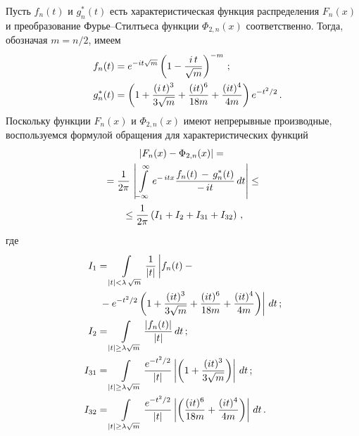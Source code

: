 \begin{multicols}{2}
Пусть $f_n(t)$ и $g^*_n(t)$ есть характеристическая функция распределения   $F_n(x)$ и преобразование Фурье--Стил\-тье\-са 
функции   $\Phi_{2,n}(x)$ соответственно. Тогда, обозначая   $m=n/2$, имеем
\begin{align*}
 f_n(t) &= e^{-it\sqrt{m}}\left(1-\displaystyle\frac{\displaystyle i\,t\mathstrut}{\displaystyle \sqrt{m}\mathstrut}\right)^{-m}\,;
\\
\quad g^*_n(t) &=
\left(1+\displaystyle\frac{\displaystyle (i\,t)^3\mathstrut}{\displaystyle 3\sqrt{m}\mathstrut}+\displaystyle\frac{\displaystyle (it)^6\mathstrut}{\displaystyle 18m\mathstrut}+\displaystyle\frac{\displaystyle (it)^4\mathstrut}{\displaystyle 4m\mathstrut} \right) e^{-t^2/2}\,. 
\end{align*}
Поскольку функции $F_n(x)$ и $\Phi_{2,n}(x)$ имеют непрерывные производные, воспользуемся 
формулой обращения для характеристических функций
\begin{multline*}
\left| F_n(x) - \Phi_{2,n}(x) \right| ={}\\
{}=  \displaystyle\frac{\displaystyle  1\mathstrut}{\displaystyle  2\pi\mathstrut}\,\left|
\int\limits_{-\infty}^\infty e^{-\,itx}\displaystyle\frac{\displaystyle f_n(t)\,-\,g^*_n(t)\mathstrut}{\displaystyle -\,it\mathstrut}\,dt \right| \leq{}\\
{}\leq  \displaystyle\frac{\displaystyle  1\mathstrut}{\displaystyle  2\pi\mathstrut}\left( I_1+I_2+I_{31}+I_{32}\right)\,, 
\end{multline*}
где
\begin{align*}
 I_1 &= \int\limits_{|t|<\lambda\,\sqrt{m}} \fr{1}{|t|}
\left|\vphantom{\fr{(it)^3}{\sqrt{m}}}
f_n(t)-{}\right.\\
&\left.{}-e^{-t^2/2}\left(1+\fr{(it)^3}{3\sqrt{m}}+
\fr{(it)^6}{18m}+\fr{(it)^4}{4m} \right) \right| \, dt\,;\\
 I_2&=\int\limits_{|t|\geq \lambda \sqrt{m}} \fr{|f_n(t)|}{|t|} \, dt \,;\\
  I_{31} &= \int\limits_{|t|\geq\lambda \sqrt{m}} \fr{e^{-t^2/2}}{|t|}
  \left|\left(1+\fr{(it)^3}{3\sqrt{m}}\right)\right| \,dt\,;\\
 I_{32}&= \int\limits_{|t|\geq\lambda \sqrt{m}} \fr{e^{-t^2/2}}{|t|}
  \left|\left(\fr{(it)^6}{18m}+\fr{(it)^4}{4m} \right) \right|\, dt\,.
  \end{align*}

\medskip



\end{multicols}

